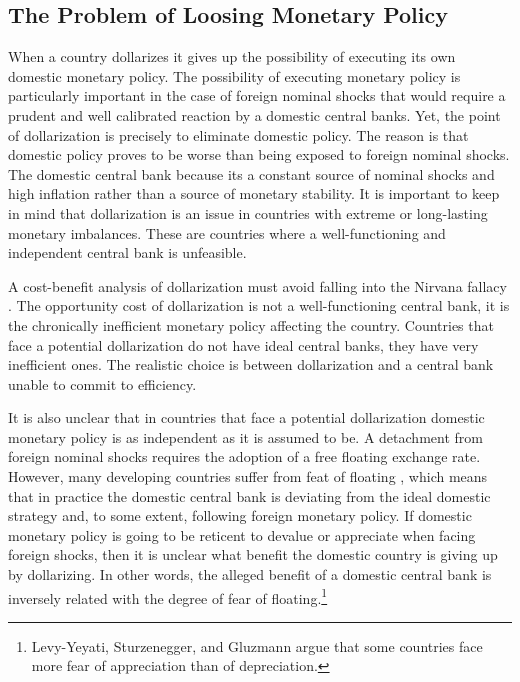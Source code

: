 \documentclass[12pt]{article}
\begin{document}
\subsection{The Problem of Loosing Monetary Policy}

When a country dollarizes it gives up the possibility of executing its own domestic monetary policy. The possibility of executing monetary policy is particularly important in the case of foreign nominal shocks that would require a prudent and well calibrated reaction by a domestic central banks. Yet, the point of dollarization is precisely to eliminate domestic policy. The reason is that domestic policy proves to be worse than being exposed to foreign nominal shocks. The domestic central bank because its a constant source of nominal shocks and high inflation rather than a source of monetary stability. It is important to keep in mind that dollarization is an issue in countries with extreme or long-lasting monetary imbalances. These are countries where a well-functioning and independent central bank is unfeasible.

A cost-benefit analysis of dollarization must avoid falling into the Nirvana fallacy \parencite{Demsetz1969}. The opportunity cost of dollarization is not a well-functioning central bank, it is the chronically inefficient monetary policy affecting the country. Countries that face a potential dollarization do not have ideal central banks, they have very inefficient ones. The realistic choice is between dollarization and a central bank unable to commit to efficiency.

It is also unclear that in countries that face a potential dollarization domestic monetary policy is as independent as it is assumed to be. A detachment from foreign nominal shocks requires the adoption of a free floating exchange rate. However, many developing countries suffer from feat of floating \parencite{Calvo2002}, which means that in practice the domestic central bank is deviating from the ideal domestic strategy and, to some extent, following foreign monetary policy. If domestic monetary policy is going to be reticent to devalue or appreciate when facing foreign shocks, then it is unclear what benefit the domestic country is giving up by dollarizing. In other words, the alleged benefit of a domestic central bank is inversely related with the degree of fear of floating.\footnote{Levy-Yeyati, Sturzenegger, and Gluzmann \parencite{Levy-Yeyati2003} argue that some countries face more fear of appreciation than of depreciation.}
\end{document}
